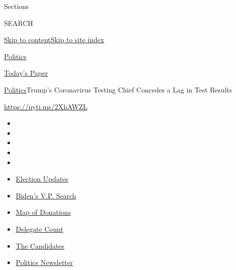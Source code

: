 Sections

SEARCH

\protect\hyperlink{site-content}{Skip to
content}\protect\hyperlink{site-index}{Skip to site index}

\href{https://www.nytimes.com/section/politics}{Politics}

\href{https://myaccount.nytimes.com/auth/login?response_type=cookie\&client_id=vi}{}

\href{https://www.nytimes.com/section/todayspaper}{Today's Paper}

\href{/section/politics}{Politics}\textbar{}Trump's Coronavirus Testing
Chief Concedes a Lag in Test Results

\url{https://nyti.ms/2XhAWZL}

\begin{itemize}
\item
\item
\item
\item
\item
\end{itemize}

\begin{itemize}
\item
  \href{https://www.nytimes.com/2020/07/31/us/elections/biden-vs-trump.html?action=click\&pgtype=Article\&state=default\&region=TOP_BANNER\&context=storylines_menu}{Election
  Updates}
\item
  \href{https://www.nytimes.com/article/biden-vice-president-2020.html?action=click\&pgtype=Article\&state=default\&region=TOP_BANNER\&context=storylines_menu}{Biden's
  V.P. Search}
\item
  \href{https://www.nytimes.com/interactive/2020/07/24/us/politics/trump-biden-campaign-donors.html?action=click\&pgtype=Article\&state=default\&region=TOP_BANNER\&context=storylines_menu}{Map
  of Donations}
\item
  \href{https://www.nytimes.com/interactive/2020/us/elections/delegate-count-primary-results.html?action=click\&pgtype=Article\&state=default\&region=TOP_BANNER\&context=storylines_menu}{Delegate
  Count}
\item
  \href{https://www.nytimes.com/interactive/2019/us/politics/2020-presidential-candidates.html?action=click\&pgtype=Article\&state=default\&region=TOP_BANNER\&context=storylines_menu}{The
  Candidates}
\item
  \href{https://www.nytimes.com/newsletters/politics?action=click\&pgtype=Article\&state=default\&region=TOP_BANNER\&context=storylines_menu}{Politics
  Newsletter}
\end{itemize}

